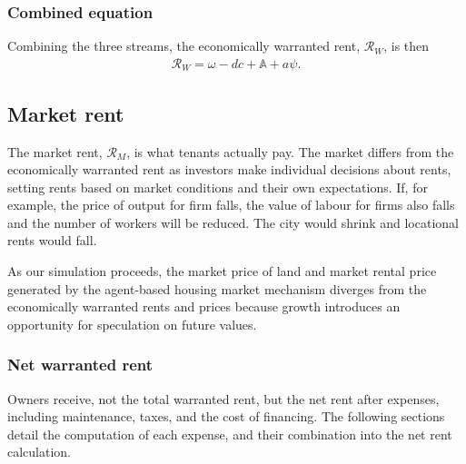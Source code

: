 \subsubsection{Combined equation}
Combining the three streams, the economically \gls{warranted rent}, $\mathcal{R}_W$, is then %
\begin{align}
\mathcal{R}_W=\omega - {dc} + \mathbb{A} + a\psi.
\label{eqn-warranted-rent}
\end{align}


\subsection{Market rent} \label{sec:market-rent}
The \gls{market rent}, $\mathcal{R}_M$, is what tenants actually pay. The market differs from the economically warranted rent as investors make individual decisions about rents, setting rents based on market conditions and their own expectations. If, for example, the price of output for firm falls, the value of labour for firms also falls and the number of workers will be reduced. The city would shrink and locational rents would fall. %

As our simulation proceeds, the market price of land and market rental price generated by the agent-based housing market mechanism diverges from the economically warranted  rents and prices  because growth introduces an opportunity for speculation on future values.

\subsubsection{Net warranted rent} \label{section-net-rent}
Owners receive, not the total warranted rent, but the \gls{net rent} after expenses, including maintenance, taxes, and the cost of financing. The following sections detail the computation of each expense, and their combination into the net rent calculation.


